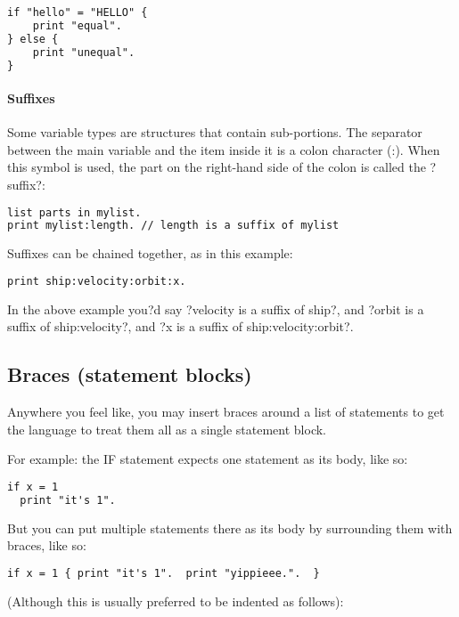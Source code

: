 \begin{lstlisting}[frame=single,language=XML]
if "hello" = "HELLO" {
    print "equal".
} else {
    print "unequal".
}
\end{lstlisting}

\paragraph{Suffixes}
Some variable types are structures that contain sub-portions. The separator between the main variable and the item inside it is a colon character (:). When this symbol is used, the part on the right-hand side of the colon is called the ?suffix?:

\begin{lstlisting}[frame=single,language=XML]
list parts in mylist.
print mylist:length. // length is a suffix of mylist
\end{lstlisting}

Suffixes can be chained together, as in this example:

\begin{lstlisting}[frame=single,language=XML]
print ship:velocity:orbit:x.
\end{lstlisting}

In the above example you?d say ?velocity is a suffix of ship?, and ?orbit is a suffix of ship:velocity?, and ?x is a suffix of ship:velocity:orbit?.

\subsection{Braces (statement blocks)}
Anywhere you feel like, you may insert braces around a list of statements to get the language to treat them all as a single statement block.

For example: the IF statement expects one statement as its body, like so:

\begin{lstlisting}[frame=single,language=XML]
if x = 1
  print "it's 1".
\end{lstlisting}

But you can put multiple statements there as its body by surrounding them with braces, like so:

\begin{lstlisting}[frame=single,language=XML]
if x = 1 { print "it's 1".  print "yippieee.".  }
\end{lstlisting}

(Although this is usually preferred to be indented as follows):

